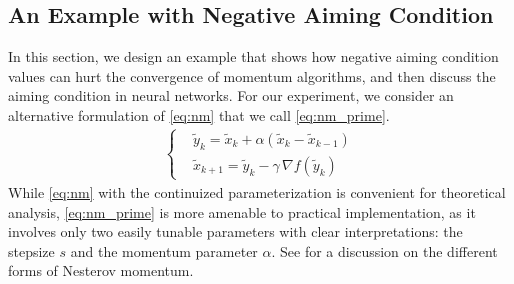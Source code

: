 \documentclass{article}
\theoremstyle{plain}
\theoremstyle{definition}
\theoremstyle{remark}
\begin{document}
\subsection{An Example with Negative Aiming Condition}\label{sec:numerical_1}
In this section, we design an example that shows how negative aiming condition values can hurt the convergence of momentum algorithms, and then discuss the aiming condition in neural networks. For our experiment, we consider an alternative formulation of \eqref{eq:nm} that we call \eqref{eq:nm_prime}.
\begin{equation}\label{eq:nm_prime}\tag{NM'}
    \begin{array}{c}
\left\{
\begin{aligned}
&\tilde y_k = \tilde x_k + \alpha(\tilde x_k -\tilde x_{k-1})  \\
&\tilde x_{k+1} =\tilde y_k - \gamma\, \nabla f(\tilde y_k)
\end{aligned}
\right.
\end{array}
\end{equation}
While \eqref{eq:nm} with the continuized parameterization is convenient for theoretical analysis, \eqref{eq:nm_prime} is more amenable to practical implementation, as it involves only two easily tunable parameters with clear interpretations: the stepsize $s$ and the momentum parameter $\alpha$. See \cite{defazio2019curved} for a discussion on the different forms of Nesterov momentum.
\end{document}
